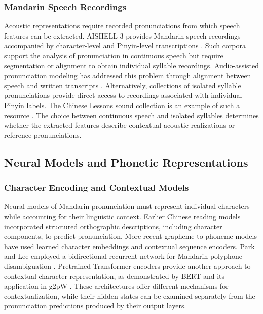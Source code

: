 \subsubsection{Mandarin Speech Recordings}
\label{sec:lr-speech-recordings}

Acoustic representations require recorded pronunciations from which speech
features can be extracted. AISHELL-3 provides Mandarin speech recordings
accompanied by character-level and Pinyin-level transcriptions
\cite{ref_aishell32021}. Such corpora support the analysis of pronunciation in
continuous speech but require segmentation or alignment to obtain individual
syllable recordings. Audio-assisted pronunciation modeling has addressed this
problem through alignment between speech and written transcripts
\cite{ref_g2pa2024}. Alternatively, collections of isolated syllable
pronunciations provide direct access to recordings associated with individual
Pinyin labels. The Chinese Lessons sound collection is an example of such a
resource \cite{ref_chinese_lessons}. The choice between continuous speech and
isolated syllables determines whether the extracted features describe contextual
acoustic realizations or reference pronunciations.


\subsection{Neural Models and Phonetic Representations}
\label{sec:lr-models}

\subsubsection{Character Encoding and Contextual Models}
\label{sec:lr-character-models}

Neural models of Mandarin pronunciation must represent individual characters
while accounting for their linguistic context. Earlier Chinese reading models
incorporated structured orthographic descriptions, including character
components, to predict pronunciation. More recent grapheme-to-phoneme models
have used learned character embeddings and contextual sequence encoders. Park
and Lee employed a bidirectional recurrent network for Mandarin polyphone
disambiguation \cite{ref_g2pm2020}. Pretrained Transformer encoders provide
another approach to contextual character representation, as demonstrated by BERT
and its application in g2pW \cite{ref_bert2019,ref_g2pw2022}. These
architectures offer different mechanisms for contextualization, while their
hidden states can be examined separately from the pronunciation predictions
produced by their output layers.

